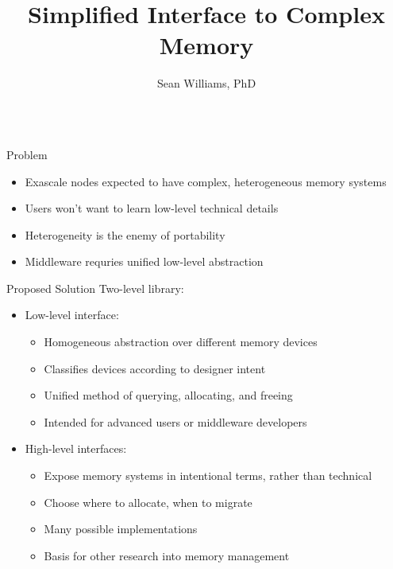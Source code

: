 \documentclass[final,hyperref={pdfpagelabels=false}]{beamer}
\title{Simplified Interface to Complex Memory}
\author{Sean Williams, PhD}
\institute{Los Alamos National Laboratory}
\date{}
\begin{document}
\begin{frame}{}
\begin{columns}[t]
  \begin{column}{.45\linewidth}
    \begin{block}{Problem}
      \begin{itemize}
        \item Exascale nodes expected to have complex, heterogeneous memory systems
        \item Users won't want to learn low-level technical details
        \item Heterogeneity is the enemy of portability
        \item Middleware requries unified low-level abstraction
      \end{itemize}
    \end{block}
    
    \begin{block}{Proposed Solution}
      Two-level library:
      \begin{itemize}
        \item Low-level interface:
        \begin{itemize}
          \item Homogeneous abstraction over different memory devices
          \item Classifies devices according to designer intent
          \item Unified method of querying, allocating, and freeing
          \item Intended for advanced users or middleware developers
        \end{itemize}
        \item High-level interfaces:
        \begin{itemize}
          \item Expose memory systems in intentional terms, rather than technical
          \item Choose where to allocate, when to migrate
          \item Many possible implementations
          \item Basis for other research into memory management
        \end{itemize}
      \end{itemize}
    \end{block}
    

\end{column}
\end{columns}
\end{frame}
\end{document}
